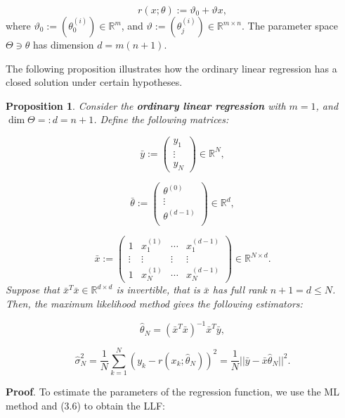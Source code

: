 \documentclass{report}
\newtheorem{proposition}{Proposition}[chapter]
\begin{document}
\begin{equation}
r(x;\theta) :=  \vartheta_0 + \vartheta x,
\end{equation}
where $\vartheta_0 := (\theta_0^{(i)}) \in \mathbb{R}^m$, and $\vartheta := (\theta_j^{(i)}) \in \mathbb{R}^{m \times n}$. The parameter space $\Theta \ni \theta$ has dimension $d = m(n+1)$.

The following proposition illustrates how the ordinary linear regression has a closed solution under certain hypotheses.

\begin{proposition}
Consider the \textbf{ordinary linear regression} with $m=1$, and $\dim \Theta =: d = n + 1$. Define the following matrices:

\begin{equation}
\bar{y} := \begin{pmatrix}y_1\\
\vdots\\
y_N
\end{pmatrix} \in \mathbb{R}^N,
\end{equation}

\begin{equation}
\bar{\theta} := \begin{pmatrix}\theta^{(0)}\\
\vdots\\
\theta^{(d-1)}\\
\end{pmatrix} \in \mathbb{R}^{d},
\end{equation}

\begin{equation}
\bar{x} := \begin{pmatrix}
1 & x^{(1)}_1 & \cdots & x^{(d-1)}_1\\
\vdots & \vdots  & \vdots & \vdots \\
1 & x^{(1)}_N  &\cdots & x^{(d-1)}_N
\end{pmatrix} \in \mathbb{R}^{N \times d}.
\end{equation}
Suppose that $\bar{x}^T\bar{x} \in \mathbb{R}^{d \times d}$ is invertible, that is $\bar{x}$ has full rank $n + 1 = d \leq N$. Then, the maximum likelihood method gives the following estimators:

\begin{equation}
\hat{\theta}_N = (\bar{x}^T\bar{x})^{-1}\bar{x}^T\bar{y},
\end{equation}

\begin{equation}
\hat{\sigma}_N^2 = \frac{1}{N}\sum_{k=1}^{N}(y_k-r(x_k;\hat{\theta}_N))^2 = \frac{1}{N}||\bar{y} -\bar{x}\hat{\theta}_N||^2.
\end{equation}
\end{proposition}
\textbf{Proof}. To estimate the parameters of the regression function, we use the ML method and (3.6) to obtain the LLF:
\end{document}

